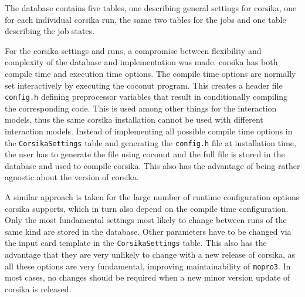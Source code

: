The \mopro{} database contains five tables,
one describing general settings for \gls{corsika},
one for each individual \gls{corsika} run, the same two tables for the
\ceres{} jobs and one table describing the job states.

For the \gls{corsika} settings and runs, a compromise between flexibility and
complexity of the database and implementation was made.
\gls{corsika} has both compile time and execution time options.
The compile time options are normally set interactively by executing
the \gls{coconut} program.
This creates a header file \texttt{config.h} defining preprocessor variables that result in conditionally
compiling the corresponding code. 
This is used among other things for the interaction models, thus the same \gls{corsika}
installation cannot be used with different interaction models.
Instead of implementing all possible compile time options in
the \texttt{CorsikaSettings} table and generating the \texttt{config.h} file
at installation time, the user has to generate the file using \gls{coconut} and 
the full file is stored in the database and used to compile \gls{corsika}.
This also has the advantage of being rather agnostic about the version of \gls{corsika}.

A similar approach is taken for the large number of runtime 
configuration options \gls{corsika} supports, which in turn also depend on
the compile time configuration.
Only the most fundamental settings most likely to change
between runs of the same kind are stored in the database.
Other parameters have to be changed via the input card template in the \texttt{CorsikaSettings} table.
This also has the advantage that they are very unlikely to change with a new release of \gls{corsika}, as all these options are very fundamental,
improving maintainability of \texttt{mopro3}.
In most cases, no changes should be required when a new minor version update of \gls{corsika} is released.

